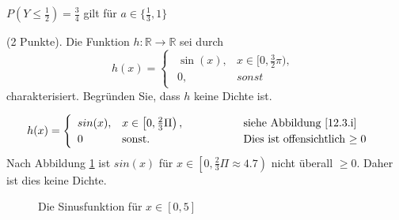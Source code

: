 \documentclass[twoside]{article}
\begin{document}
$P(Y\leq\frac{1}{2})=\frac{3}{4}$ gilt für $a\in\{\frac{1}{3},1\}$

(2 Punkte).
Die Funktion $h: \mathbb{R} \rightarrow \mathbb{R}$ sei durch
\[
	h(x) =	\begin{cases}
				\begin{array}{ll}
					\operatorname{sin}(x),	&	x \in [0, \frac{3}{2}\pi),\\
					0,						&	sonst
				\end{array}	
			\end{cases}
\]
charakterisiert.
Begründen Sie, dass $h$ keine Dichte ist.


\[
    h(x)=\begin{cases}
        \begin{array}{lll}
            sin(x),	& x \in \left[0,\frac{2}{3}\Pi\right),&\text{\phantom{}\hspace{1.6cm}siehe Abbildung \ref{12.3.i}}\\
            0					& \text{sonst}.&\text{\phantom{}\hspace{1.6cm}Dies ist offensichtlich $\geq 0$}
        \end{array}
    \end{cases}
\]
Nach Abbildung \ref{12.3.i} ist $sin(x)$ für $x \in \left[0,\frac{2}{3}\Pi\approx4.7\right)$ nicht überall $\geq 0$.
Daher ist dies keine Dichte.

\begin{figure}
\caption{Die Sinusfunktion für $x\in[0,5]$}
\label{12.3.i}
\end{figure}
\fi
\end{document}
